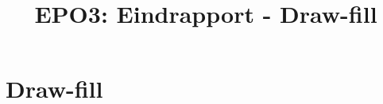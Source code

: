 \documentclass{scrartcl} %
\author{}
\title{EPO3: Eindrapport - Draw-fill}
\begin{document}
\section{Draw-fill}
\label{sec:draw-fill}
\end{document}

